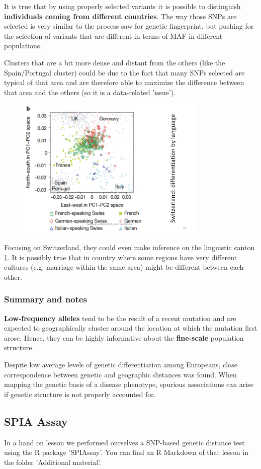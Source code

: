 It is true that by using properly selected variants it is possible to
distinguish \textbf{individuals coming from different countries}. The way those
SNPs are selected is very similar to the process saw for genetic fingerprint,
but pushing for the selection of variants that are different in terms of MAF in
different populations. 

Clusters that are a bit more dense and distant from the others (like the
Spain/Portugal cluster) could be due to the fact that many SNPs selected are
typical of that area and are therefore able to maximize the difference between
that area and the others (so it is a data-related 'issue').
% 
\begin{figure}[ht]
	\centering
	\includegraphics[width=0.8\textwidth]{PCA_swiss.PNG}
	\caption{\label{fig: PCA_swiss}}
\end{figure}

Focusing on Switzerland, they could even make inference on the linguistic canton
\ref{fig: PCA_swiss}. It is possibly true that in country where some regions
have very different cultures (e.g. marriage within the same area) might be
different between each other. 


\subsubsection{Summary and notes}
\textbf{Low-frequency alleles} tend to be the result of a recent mutation and
are expected to geographically cluster around the location at which the mutation
first arose. Hence, they can be highly informative about the \textbf{fine-scale}
population structure.

Despite low average levels of genetic differentiation among Europeans, close
correspondence between genetic and geographic distances was found. When mapping
the genetic basis of a disease phenotype, spurious associations can arise if
genetic structure is not properly accounted for.



\subsection{SPIA Assay} \label{subsect: SPIA} In a hand on lesson we performed
ourselves a SNP-based genetic distance test using the R package 'SPIAssay'. You
can find an R Markdown of that lesson in the folder 'Additional material'. 